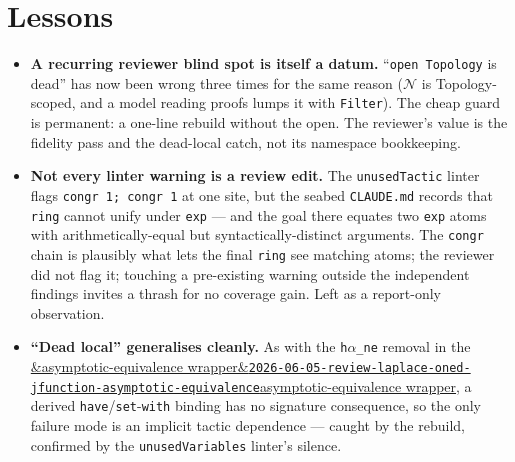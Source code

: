 \documentclass[11pt]{article}
\newcommand{\reviewref}[2][]{\href{https://therisensea.org/reviews/#2/}{\ifx&#1&\texttt{#2}\else#1\fi}}
\begin{document}
\section{Lessons}
\begin{itemize}[noitemsep]
  \item \textbf{A recurring reviewer blind spot is itself a datum.} ``\texttt{open Topology} is
    dead'' has now been wrong three times for the same reason (\texttt{$\mathcal N$} is
    Topology-scoped, and a model reading proofs lumps it with \texttt{Filter}). The cheap guard is
    permanent: a one-line rebuild without the open. The reviewer's value is the fidelity pass and
    the dead-local catch, not its namespace bookkeeping.
  \item \textbf{Not every linter warning is a review edit.} The \texttt{unusedTactic} linter flags
    \texttt{congr 1; congr 1} at one site, but the seabed \texttt{CLAUDE.md} records that
    \texttt{ring} cannot unify under \texttt{exp} --- and the goal there equates two \texttt{exp}
    atoms with arithmetically-equal but syntactically-distinct arguments. The \texttt{congr} chain
    is plausibly what lets the final \texttt{ring} see matching atoms; the reviewer did not flag it;
    touching a pre-existing warning outside the independent findings invites a thrash for no
    coverage gain. Left as a report-only observation.
  \item \textbf{``Dead local'' generalises cleanly.} As with the \texttt{h$\alpha$\_ne} removal in
    the \reviewref[asymptotic-equivalence wrapper]{2026-06-05-review-laplace-oned-jfunction-asymptotic-equivalence},
    a derived \texttt{have}/\texttt{set}-\texttt{with} binding has no signature consequence, so the
    only failure mode is an implicit tactic dependence --- caught by the rebuild, confirmed by the
    \texttt{unusedVariables} linter's silence.
\end{itemize}
\end{document}
